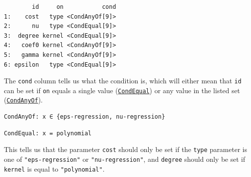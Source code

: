 \begin{Shaded}
\begin{Highlighting}[]
\NormalTok{(}\NormalTok{)}\SpecialCharTok{$}\SpecialCharTok{$}
\end{Highlighting}
\end{Shaded}

\begin{verbatim}
        id     on           cond
1:    cost   type <CondAnyOf[9]>
2:      nu   type <CondEqual[9]>
3:  degree kernel <CondEqual[9]>
4:   coef0 kernel <CondAnyOf[9]>
5:   gamma kernel <CondAnyOf[9]>
6: epsilon   type <CondEqual[9]>
\end{verbatim}

The \texttt{cond} column tells us what the condition is, which will
either mean that \texttt{id} can be set if \texttt{on} equals a single
value
(\href{https://paradox.mlr-org.com/reference/Condition.html}{\texttt{CondEqual}})
or any value in the listed set
(\href{https://paradox.mlr-org.com/reference/Condition.html}{\texttt{CondAnyOf}}).

\begin{Shaded}
\begin{Highlighting}[]
\NormalTok{(}\NormalTok{)}\SpecialCharTok{$}\SpecialCharTok{$}\NormalTok{deps[[}\NormalTok{, }\NormalTok{]]}
\end{Highlighting}
\end{Shaded}

\begin{verbatim}
CondAnyOf: x ∈ {eps-regression, nu-regression}
\end{verbatim}

\begin{Shaded}
\begin{Highlighting}[]
\NormalTok{(}\NormalTok{)}\SpecialCharTok{$}\SpecialCharTok{$}\NormalTok{deps[[}\NormalTok{, }\NormalTok{]]}
\end{Highlighting}
\end{Shaded}

\begin{verbatim}
CondEqual: x = polynomial
\end{verbatim}

This tells us that the parameter \texttt{cost} should only be set if the
\texttt{type} parameter is one of \texttt{"eps-regression"} or
\texttt{"nu-regression"}, and \texttt{degree} should only be set if
\texttt{kernel} is equal to \texttt{"polynomial"}.

